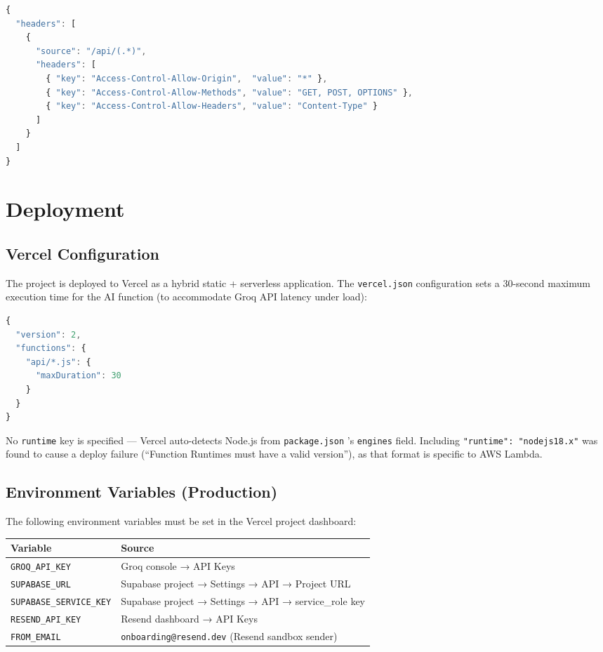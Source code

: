 \documentclass[12pt, a4paper]{article}
\newcommand{\inlinecode}[1]{%
  \colorbox{inlinecode!20}{\texttt{\small #1}}%
}
\begin{document}
\begin{lstlisting}[language=JavaScript, caption={vercel.json CORS configuration}]
{
  "headers": [
    {
      "source": "/api/(.*)",
      "headers": [
        { "key": "Access-Control-Allow-Origin",  "value": "*" },
        { "key": "Access-Control-Allow-Methods", "value": "GET, POST, OPTIONS" },
        { "key": "Access-Control-Allow-Headers", "value": "Content-Type" }
      ]
    }
  ]
}
\end{lstlisting}

\section{Deployment}

\subsection{Vercel Configuration}

The project is deployed to Vercel as a hybrid static + serverless application. The
\inlinecode{vercel.json} configuration sets a 30-second maximum execution time for the
AI function (to accommodate Groq API latency under load):

\begin{lstlisting}[language=JavaScript, caption={vercel.json}]
{
  "version": 2,
  "functions": {
    "api/*.js": {
      "maxDuration": 30
    }
  }
}
\end{lstlisting}

No \inlinecode{runtime} key is specified --- Vercel auto-detects Node.js from
\inlinecode{package.json}'s \inlinecode{engines} field. Including
\inlinecode{"runtime": "nodejs18.x"} was found to cause a deploy failure
(``Function Runtimes must have a valid version''), as that format is specific to AWS
Lambda.

\subsection{Environment Variables (Production)}

The following environment variables must be set in the Vercel project dashboard:

\begin{center}
\begin{tabular}{ll}
\toprule
\textbf{Variable} & \textbf{Source} \\
\midrule
\texttt{GROQ\_API\_KEY} & Groq console → API Keys \\
\texttt{SUPABASE\_URL} & Supabase project → Settings → API → Project URL \\
\texttt{SUPABASE\_SERVICE\_KEY} & Supabase project → Settings → API → service\_role key \\
\texttt{RESEND\_API\_KEY} & Resend dashboard → API Keys \\
\texttt{FROM\_EMAIL} & \texttt{onboarding@resend.dev} (Resend sandbox sender) \\
\bottomrule
\end{tabular}
\end{center}
\end{document}
